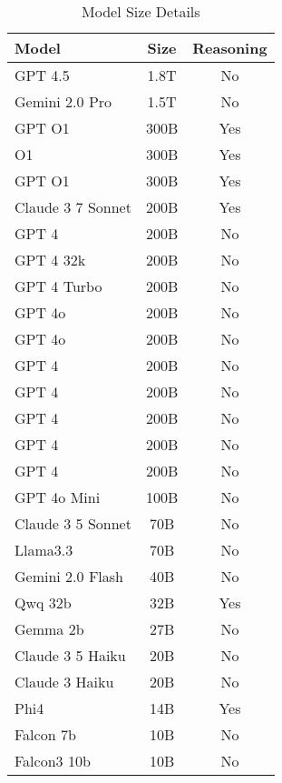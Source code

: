 \begin{table}[ht]
\centering
\caption{Model Size Details}
\label{tab:model-details}
\begin{tabular}{lcc}
\toprule
\textbf{Model} & \textbf{Size} & \textbf{Reasoning} \\
\midrule
GPT 4.5 & 1.8T & No \\
Gemini 2.0 Pro & 1.5T & No \\
GPT O1 & 300B & Yes \\
O1 & 300B & Yes \\
GPT O1 & 300B & Yes \\
Claude 3 7 Sonnet & 200B & Yes \\
GPT 4 & 200B & No \\
GPT 4 32k & 200B & No \\
GPT 4 Turbo & 200B & No \\
GPT 4o & 200B & No \\
GPT 4o & 200B & No \\
GPT 4 & 200B & No \\
GPT 4 & 200B & No \\
GPT 4 & 200B & No \\
GPT 4 & 200B & No \\
GPT 4 & 200B & No \\
GPT 4o Mini & 100B & No \\
Claude 3 5 Sonnet & 70B & No \\
Llama3.3 & 70B & No \\
Gemini 2.0 Flash & 40B & No \\
Qwq 32b & 32B & Yes \\
Gemma 2b & 27B & No \\
Claude 3 5 Haiku & 20B & No \\
Claude 3 Haiku & 20B & No \\
Phi4 & 14B & Yes \\
Falcon 7b & 10B & No \\
Falcon3 10b & 10B & No \\
\bottomrule
\end{tabular}
\end{table}
